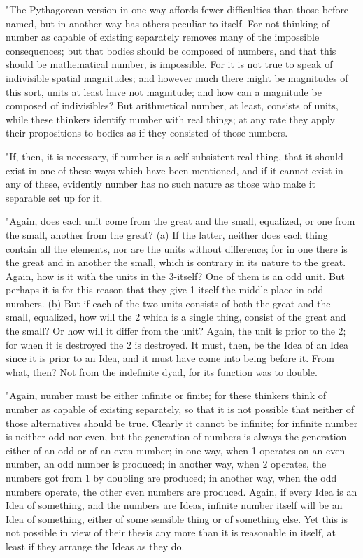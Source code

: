 "The Pythagorean version in one way affords fewer difficulties than
those before named, but in another way has others peculiar to itself.
For not thinking of number as capable of existing separately removes
many of the impossible consequences; but that bodies should be composed
of numbers, and that this should be mathematical number, is impossible.
For it is not true to speak of indivisible spatial magnitudes; and
however much there might be magnitudes of this sort, units at least
have not magnitude; and how can a magnitude be composed of indivisibles?
But arithmetical number, at least, consists of units, while these
thinkers identify number with real things; at any rate they apply
their propositions to bodies as if they consisted of those numbers.

"If, then, it is necessary, if number is a self-subsistent real thing,
that it should exist in one of these ways which have been mentioned,
and if it cannot exist in any of these, evidently number has no such
nature as those who make it separable set up for it. 

"Again, does each unit come from the great and the small, equalized,
or one from the small, another from the great? (a) If the latter,
neither does each thing contain all the elements, nor are the units
without difference; for in one there is the great and in another the
small, which is contrary in its nature to the great. Again, how is
it with the units in the 3-itself? One of them is an odd unit. But
perhaps it is for this reason that they give 1-itself the middle place
in odd numbers. (b) But if each of the two units consists of both
the great and the small, equalized, how will the 2 which is a single
thing, consist of the great and the small? Or how will it differ from
the unit? Again, the unit is prior to the 2; for when it is destroyed
the 2 is destroyed. It must, then, be the Idea of an Idea since it
is prior to an Idea, and it must have come into being before it. From
what, then? Not from the indefinite dyad, for its function was to
double. 

"Again, number must be either infinite or finite; for these thinkers
think of number as capable of existing separately, so that it is not
possible that neither of those alternatives should be true. Clearly
it cannot be infinite; for infinite number is neither odd nor even,
but the generation of numbers is always the generation either of an
odd or of an even number; in one way, when 1 operates on an even number,
an odd number is produced; in another way, when 2 operates, the numbers
got from 1 by doubling are produced; in another way, when the odd
numbers operate, the other even numbers are produced. Again, if every
Idea is an Idea of something, and the numbers are Ideas, infinite
number itself will be an Idea of something, either of some sensible
thing or of something else. Yet this is not possible in view of their
thesis any more than it is reasonable in itself, at least if they
arrange the Ideas as they do. 

